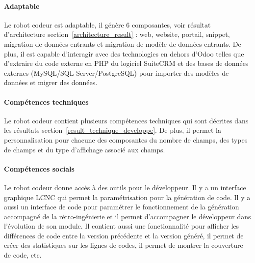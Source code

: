 \paragraph{Adaptable}
Le robot codeur est adaptable, il génère 6 composantes, voir résultat d'architecture section~\ref{architecture_result} : web, website, portail, snippet, migration de données entrants et migration de modèle de données entrants. De plus, il est capable d'interagir avec des technologies en dehors d'Odoo telles que d'extraire du code externe en PHP du logiciel SuiteCRM et des bases de données externes (MySQL/SQL Server/PostgreSQL) pour importer des modèles de données et migrer des données.


\paragraph{Compétences techniques}
Le robot codeur contient plusieurs compétences techniques qui sont décrites dans les résultats section~\ref{result_technique_developpe}. De plus, il permet la personnalisation pour chacune des composantes du nombre de champs, des types de champs et du type d'affichage associé aux champs.


\paragraph{Compétences socials}
Le robot codeur donne accès à des outils pour le développeur. Il y a un interface graphique LCNC qui permet la paramétrisation pour la génération de code. Il y a aussi un interface de code pour paramétrer le fonctionnement de la génération accompagné de la rétro-ingénierie et il permet d'accompagner le développeur dans l'évolution de son module. Il contient aussi une fonctionnalité pour afficher les différences de code entre la version précédente et la version généré, il permet de créer des statistiques sur les lignes de codes, il permet de montrer la couverture de code, etc.


